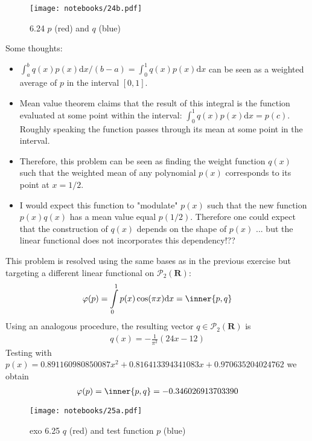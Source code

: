 \begin{figure}[h!]
\centering
\texttt{[image: notebooks/24b.pdf]}
\caption{6.24 $p$ (red) and $q$ (blue)} 
\end{figure}

Some thoughts:
\begin{itemize}
\item $\int_a^b q(x)p(x)\mathrm{d}x/(b-a)= \int_0^1 q(x)p(x)\mathrm{d}x$ can be seen as a weighted average of $p$ in the interval $[0,1]$.  
\item Mean value theorem claims that the result of this integral is the function evaluated at some point within the interval: $\int_0^1 q(x)p(x)\mathrm{d}x = p(c)$. Roughly speaking the function passes through its mean at some point in the interval.
\item Therefore, this problem can be seen as finding the weight function $q(x)$ such that the weighted mean of any polynomial $p(x)$ corresponds to its point at $x=1/2$.
\item I would expect this function to "modulate" $p(x)$ such that the new function $p(x)q(x)$ has a mean value equal $p(1/2)$. Therefore one could expect that the construction of $q(x)$ depends on the shape of $p(x)$ ... but the linear functional does not incorporates this dependency!??
\end{itemize}


\exo{} This problem is resolved using the same bases as in the previous exercise but targeting a different linear functional on $\mathcal{P}_2(\mathbf{R})$:
\begin{align*}
\varphi(p) = \int\limits_0^1p(x)\cos(\pi x)\mathrm{d}x = \inner{p,q} 
\end{align*}
Using an analogous procedure, the resulting vector $q\in\mathcal{P}_2(\mathbf{R})$ is
\begin{align}
\label{eq:res25a}
q(x)= - \frac{1}{\pi^{2}} \left(24 x - 12\right)
\end{align}
Testing with $p(x)= 0.891160980850087 x^{2} + 0.816413394341083 x + 0.970635204024762$ we obtain
\begin{align*}
\varphi(p) = \inner{p,q} = -0.346026913703390
\end{align*}

\begin{figure}[h!]
\centering
\texttt{[image: notebooks/25a.pdf]}
\caption{ exo 6.25 $q$ (red) and test function $p$ (blue) }
\end{figure}

